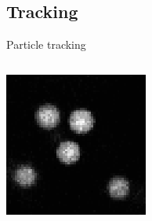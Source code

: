 \subsection{Tracking}
\begin{frame}{Particle tracking}
	\begin{columns}[T]
	\includegraphics[width=\textwidth]{dillute_raw}
	

\end{columns}
\end{frame}
